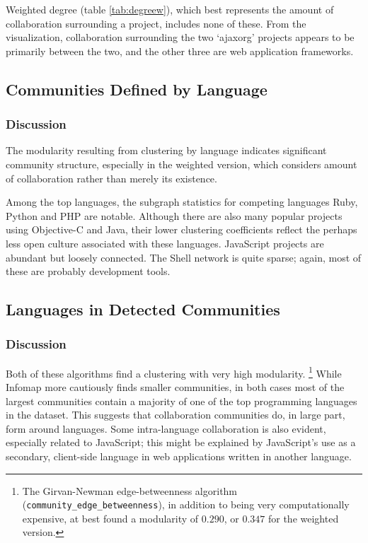 \documentclass[11pt]{article}
\begin{document}
Weighted degree (table \ref{tab:degreew}), which best represents the amount of
collaboration surrounding a project, includes none of these. From the
visualization, collaboration surrounding the two `ajaxorg' projects appears to
be primarily between the two, and the other three are web application
frameworks.

\subsection{Communities Defined by Language}



\subsubsection{Discussion}
The modularity resulting from clustering by language indicates significant
community structure, especially in the weighted version, which considers amount
of collaboration rather than merely its existence.

Among the top languages, the subgraph statistics for competing languages Ruby,
Python and PHP are notable. Although there are also many popular projects using
Objective-C and Java, their lower clustering coefficients reflect the perhaps
less open culture associated with these languages. JavaScript projects are
abundant but loosely connected. The Shell network is quite sparse; again, most
of these are probably development tools.

\subsection{Languages in Detected Communities}



\subsubsection{Discussion}
Both of these algorithms find a clustering with very high modularity.
\footnote{The Girvan-Newman edge-betweenness algorithm
(\texttt{community\_edge\_betweenness}), in addition to being very
computationally expensive, at best found a modularity of $0.290$, or $0.347$ for
the weighted version.} While Infomap more cautiously finds smaller communities,
in both cases most of the largest communities contain a majority of one of the
top programming languages in the dataset. This suggests that collaboration
communities do, in large part, form around languages. Some intra-language
collaboration is also evident, especially related to JavaScript; this might be
explained by JavaScript's use as a secondary, client-side language in web
applications written in another language.
\end{document}
